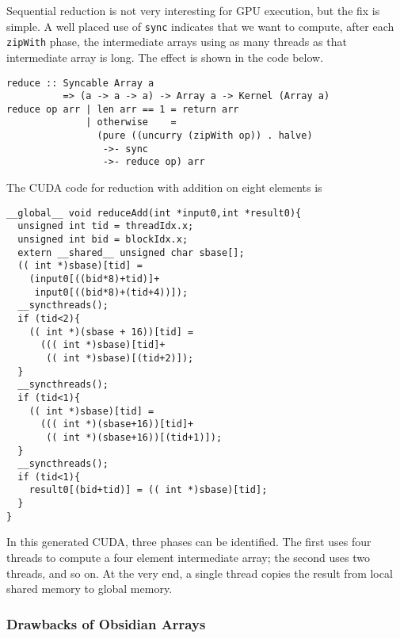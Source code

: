 Sequential reduction is not very interesting for GPU execution, but 
the fix is simple. A well placed use of {\tt sync} indicates that 
we want to compute, after each {\tt zipWith} phase, the intermediate 
arrays using as many threads as that intermediate array is long. 
The effect is shown in the code below. 
\begin{codesize} 
\begin{verbatim}
reduce :: Syncable Array a 
          => (a -> a -> a) -> Array a -> Kernel (Array a)
reduce op arr | len arr == 1 = return arr
              | otherwise    = 
                (pure ((uncurry (zipWith op)) . halve)
                 ->- sync 
                 ->- reduce op) arr
\end{verbatim}
\end{codesize}
The CUDA code for reduction with addition on eight
elements is
\begin{codesize} 
\begin{verbatim}
__global__ void reduceAdd(int *input0,int *result0){
  unsigned int tid = threadIdx.x;
  unsigned int bid = blockIdx.x;
  extern __shared__ unsigned char sbase[];
  (( int *)sbase)[tid] = 
    (input0[((bid*8)+tid)]+
     input0[((bid*8)+(tid+4))]);
  __syncthreads();
  if (tid<2){
    (( int *)(sbase + 16))[tid] = 
      ((( int *)sbase)[tid]+
       (( int *)sbase)[(tid+2)]);   
  }
  __syncthreads();
  if (tid<1){
    (( int *)sbase)[tid] = 
      ((( int *)(sbase+16))[tid]+
       (( int *)(sbase+16))[(tid+1)]);    
  }
  __syncthreads();
  if (tid<1){
    result0[(bid+tid)] = (( int *)sbase)[tid];  
  }
}
\end{verbatim}
\end{codesize}           
In this generated CUDA, three phases can be identified. 
The first uses four threads to compute a four element intermediate array;
the second uses two threads, and so on. At the very end, a single thread
copies the result from local shared memory to global memory. 

\subsubsection{Drawbacks of Obsidian Arrays}
\label{sec:Drawbacks}




